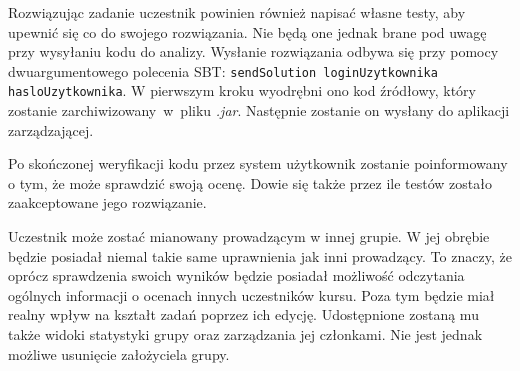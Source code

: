 \documentclass[wimgr]{xmgr}
\begin{document}
Rozwiązując zadanie uczestnik powinien również napisać własne testy, aby upewnić się co do swojego rozwiązania. Nie będą one jednak brane pod uwagę przy wysyłaniu kodu do analizy. Wysłanie rozwiązania odbywa się przy pomocy dwuargumentowego polecenia SBT: \texttt{sendSolution loginUzytkownika hasloUzytkownika}. W pierwszym kroku wyodrębni ono kod źródłowy, który zostanie zarchiwizowany~w~pliku \emph{.jar}. Następnie zostanie on wysłany do aplikacji zarządzającej.

Po skończonej weryfikacji kodu przez system użytkownik zostanie poinformowany o tym, że może sprawdzić swoją ocenę. Dowie się także przez ile testów zostało zaakceptowane jego rozwiązanie.

Uczestnik może zostać mianowany prowadzącym w innej grupie. W jej obrębie będzie posiadał niemal takie same uprawnienia jak inni prowadzący. To znaczy, że oprócz sprawdzenia swoich wyników będzie posiadał możliwość odczytania ogólnych informacji o ocenach innych uczestników kursu. Poza tym będzie miał realny wpływ na kształt zadań poprzez ich edycję. Udostępnione zostaną mu także widoki statystyki grupy oraz zarządzania jej członkami. Nie jest jednak możliwe usunięcie założyciela grupy.
\end{document}
